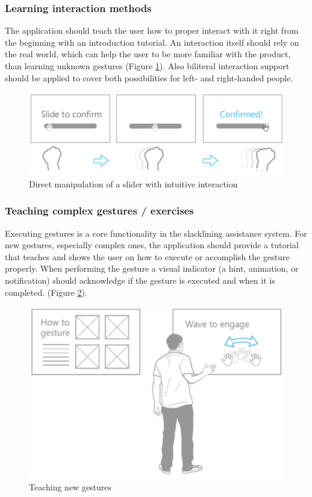 \subsubsection{Learning interaction methods}
The application should teach the user how to proper interact with it right from the beginning with an introduction tutorial. An interaction itself should rely on the real world, which can help the user to be more familiar with the product, than learning unknown gestures (Figure \ref{fig:hciGuidelinesDynamicGesture}). Also biliteral interaction support should be applied to cover both possibilities for left- and right-handed people.
\begin{figure}[htb]
	\centering
	\begin{minipage}[t]{1\linewidth}
		\centering
		\includegraphics[width=0.6\linewidth]{Pictures/hciGuidelinesDynamicGesture}
		\caption{Direct manipulation of a slider with intuitive interaction~\cite{MicrosoftHIG2014-mh}}
		\label{fig:hciGuidelinesDynamicGesture}
	\end{minipage}
\end{figure}

\subsubsection{Teaching complex gestures / exercises}
Executing gestures is a core functionality in the slacklining assistance system. For new gestures, especially complex ones, the application should provide a tutorial that teaches and shows the user on how to execute or accomplish the gesture properly. When performing the gesture a visual indicator (a hint, animation, or notification) should acknowledge if the gesture is executed and when it is completed. (Figure \ref{fig:hciGuidelinesTeachingMethods}).
\begin{figure}[htb]
	\centering
	\begin{minipage}[t]{1\linewidth}
		\centering
		\includegraphics[width=0.4\linewidth]{Pictures/hciGuidelinesTeachingMethods}
		\caption{Teaching new gestures~\cite{MicrosoftHIG2014-mh}}
		\label{fig:hciGuidelinesTeachingMethods}
	\end{minipage}
\end{figure}


